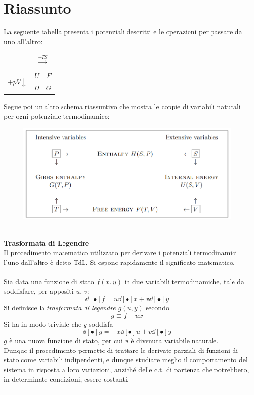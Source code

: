 \documentclass[10pt, oneside]{book}
\newcommand{\infobox}[2]{\vspace{0.5cm}~\\ \textbf{#1} \hrulefill \vspace{0.2cm}\\#2 {}\,\\\hrule \vspace{0.5cm}}
\newcommand{\ds}{\displaystyle}
\begin{document}
\section{Riassunto}
La seguente tabella presenta i potenziali descritti e le operazioni per passare da uno all'altro:
\begin{center}
\begin{tabular}{c|c|c|}
& \multicolumn{2}{c}{$\xrightarrow[]{-\ds TS}$} \\ \hline
\multirow{4}{*}{$+ pV \big\downarrow$} & \multirow{2}{*}{$U$} & \multirow{2}{*}{$F$} \\ 
& & \\\cline{2-3}
& \multirow{2}{*}{$H$} & \multirow{2}{*}{$G$} \\
& & \\\hline
\end{tabular}
\end{center}
Segue poi un altro schema riassuntivo che mostra le coppie di variabili naturali per ogni potenziale termodinamico:
\begin{figure}[h!]
\centering
\includegraphics[scale=0.6]{potentials.png}
\end{figure}

\infobox{Trasformata di Legendre}{
Il procedimento matematico utilizzato per derivare i potenziali termodinamici l'uno dall'altro è detto TdL. Si espone rapidamente il significato matematico.
\\~\\
Sia data una funzione di stato $f(x,y)$ in due variabili termodinamiche, tale da soddisfare, per appositi $u$, $v$:
\[\dd[•]{f} = u \dd[•]{x} + v \dd[•]{y}\]
Si definisce la \textit{trasformata di legendre} $g(u, y)$ secondo
\[g \equiv f - ux\]
Si ha in modo triviale che $g$ soddisfa
\[\dd[•]{g} = - x \dd[•]{u} + v \dd[•]{y}\]
$g$ è una nuova funzione di stato, per cui $u$ è divenuta variabile naturale.\\
Dunque il procedimento permette di trattare le derivate parziali di funzioni di stato come variabili indipendenti, e dunque studiare meglio il comportamento del sistema in risposta a loro variazioni, anziché delle c.t. di partenza che potrebbero, in determinate condizioni, essere costanti.
}
\end{document}
